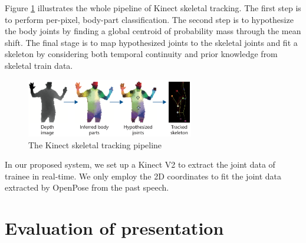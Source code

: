 
\par Figure \ref{fig:trackingpipeline} illustrates the whole pipeline of Kinect skeletal tracking. The first step is to perform per-pixel, body-part classification. The second step is to hypothesize the body joints by finding a global centroid of probability mass through the mean shift. The final stage is to map hypothesized joints to the skeletal joints and fit a skeleton by considering both temporal continuity and prior knowledge from skeletal train data.

\begin{figure}[htbp]
  \centering\includegraphics[width=0.65\textwidth]{./img/skeletaltracking.png}
  \caption[The Kinect skeletal tracking pipeline]{The Kinect skeletal tracking pipeline \cite{Zhang2012}}\label{fig:trackingpipeline}
\end{figure}

\par In our proposed system, we set up a Kinect V2 to extract the joint data of trainee in real-time. We only employ the 2D coordinates to fit the joint data extracted by OpenPose from the past speech.

\section{Evaluation of presentation}

